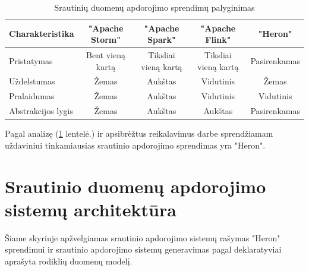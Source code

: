 \documentclass{VUMIFPSbakalaurinis}
\begin{document}
\begin{table}[!htbp]
    \begin{center}
        \caption{Srautinių duomenų apdorojimo sprendimų palyginimas}
        \label{table:comparer}
        \begin{tabular}{ | l | c | c | c | c | }
            \hline
            \cellcolor[gray]{0.8} Charakteristika & \cellcolor[gray]{0.9} "Apache Storm" & \cellcolor[gray]{0.9} "Apache Spark" & \cellcolor[gray]{0.9} "Apache Flink" & \cellcolor[gray]{0.9} "Heron" \\* \hline
            \cellcolor[gray]{0.9} Pristatymas & Bent vieną kartą & Tiksliai vieną kartą & Tiksliai vieną kartą & Pasirenkamas \\* \hline
            \cellcolor[gray]{0.9} Uždelstumas & Žemas & Aukštas & Vidutinis & Žemas \\* \hline
            \cellcolor[gray]{0.9} Pralaidumas & Žemas & Aukštas & Vidutinis & Vidutinis \\* \hline
            \cellcolor[gray]{0.9} Abstrakcijos lygis & Žemas & Aukštas & Aukštas & Pasirenkamas \\* \hline
        \end{tabular}
    \end{center}
\end{table}\par

Pagal analizę (\ref{table:comparer} lentelė.) ir apsibrėžtus reikalavimus darbe sprendžiamam uždaviniui tinkamiausias srautinio apdorojimo sprendimas yra "Heron". \par

\section{Srautinio duomenų apdorojimo sistemų architektūra}

Šiame skyriuje apžvelgiamas srautinio apdorojimo sistemų rašymas "Heron" sprendimui ir srautinio apdorojimo sistemų generavimas pagal deklaratyviai aprašyta rodiklių duomenų modelį.
\end{document}
